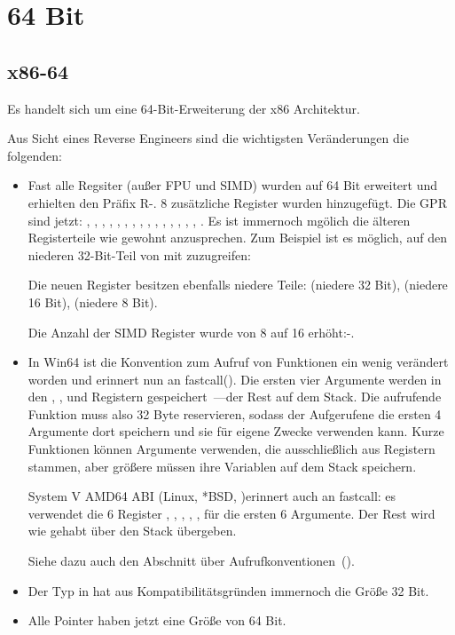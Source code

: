 \section{64 Bit}

\subsection{x86-64}
\label{x86-64}
Es handelt sich um eine 64-Bit-Erweiterung der x86 Architektur.

Aus Sicht eines Reverse Engineers sind die wichtigsten Veränderungen die folgenden:

\myindex{\CLanguageElements!\Pointers}
\begin{itemize}

\item
Fast alle Regsiter (außer FPU und SIMD) wurden auf 64 Bit erweitert und erhielten den Präfix R-. 8 zusätzliche Register
wurden hinzugefügt.
Die \ac{GPR} sind jetzt: \RAX, \RBX, \RCX, \RDX, 
\RBP, \RSP, \RSI, \RDI, , , , 
, , , , . 
Es ist immernoch mgölich die älteren Registerteile wie gewohnt anzusprechen.
Zum Beispiel ist es möglich, auf den niederen 32-Bit-Teil von \RAX mit \EAX zuzugreifen:

Die neuen  Register besitzen ebenfalls niedere Teile:  (niedere 32 Bit),
 (niedere 16 Bit),  (niedere 8 Bit).

Die Anzahl der SIMD Register wurde von 8 auf 16 erhöht:-.

\item
In Win64 ist die Konvention zum Aufruf von Funktionen ein wenig verändert worden und erinnert nun an
fastcall(). Die ersten vier Argumente werden in den \RCX, \RDX,  und  Registern
gespeichert~---der Rest auf dem Stack.
Die aufrufende Funktion muss also 32 Byte reservieren, sodass der Aufgerufene die ersten 4 Argumente dort speichern 
und sie für eigene Zwecke verwenden kann.
Kurze Funktionen können Argumente verwenden, die ausschließlich aus Registern stammen, aber größere müssen ihre
Variablen auf dem Stack speichern.

System V AMD64 ABI (Linux, *BSD, \MacOSX)\SysVABI erinnert auch an
fastcall: es verwendet die 6 Register 
\RDI, \RSI, \RDX, \RCX, ,  für die ersten 6 Argumente.
Der Rest wird wie gehabt über den Stack übergeben.

Siehe dazu auch den Abschnitt über Aufrufkonventionen~().

\item
Der Typ \Tint in \CCpp hat aus Kompatibilitätsgründen immernoch die Größe 32 Bit.

\item
Alle Pointer haben jetzt eine Größe von 64 Bit.

\end{itemize}

